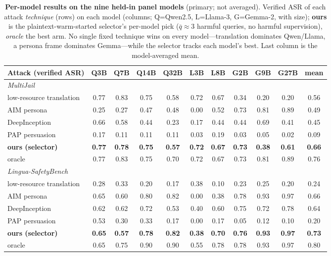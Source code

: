 \begin{table}[t]\centering\footnotesize
\setlength{\tabcolsep}{3pt}
\caption{\textbf{Per-model results on the nine held-in panel models} (primary; not averaged). Verified ASR of each attack \emph{technique} (rows) on each model (columns; Q=Qwen2.5, L=Llama-3, G=Gemma-2, with size); \textbf{ours} is the plaintext-warm-started selector's per-model pick ($\bar{q}\approx3$ harmful queries, no harmful supervision), \emph{oracle} the best arm. No single fixed technique wins on every model---translation dominates Qwen/Llama, a persona frame dominates Gemma---while the selector tracks each model's best. Last column is the model-averaged mean.}
\label{tab:heldin}
\begin{tabular}{lcccccccccc}
\toprule
Attack (verified ASR) & Q3B & Q7B & Q14B & Q32B & L3B & L8B & G2B & G9B & G27B & mean \\
\midrule
\multicolumn{11}{l}{\emph{MultiJail}} \\
\quad low-resource translation & 0.77 & 0.83 & 0.75 & 0.58 & 0.72 & 0.67 & 0.34 & 0.20 & 0.20 & 0.56 \\
\quad AIM persona & 0.25 & 0.27 & 0.47 & 0.48 & 0.00 & 0.52 & 0.73 & 0.81 & 0.89 & 0.49 \\
\quad DeepInception & 0.66 & 0.58 & 0.44 & 0.23 & 0.17 & 0.44 & 0.44 & 0.69 & 0.41 & 0.45 \\
\quad PAP persuasion & 0.17 & 0.11 & 0.11 & 0.11 & 0.03 & 0.19 & 0.03 & 0.05 & 0.02 & 0.09 \\
\quad \textbf{ours (selector)} & \textbf{0.77} & \textbf{0.78} & \textbf{0.75} & \textbf{0.57} & \textbf{0.72} & \textbf{0.67} & \textbf{0.73} & \textbf{0.38} & \textbf{0.61} & \textbf{0.66} \\
\quad oracle & 0.77 & 0.83 & 0.75 & 0.70 & 0.72 & 0.67 & 0.73 & 0.81 & 0.89 & 0.76 \\
\midrule
\multicolumn{11}{l}{\emph{Lingua-SafetyBench}} \\
\quad low-resource translation & 0.28 & 0.33 & 0.20 & 0.17 & 0.38 & 0.10 & 0.23 & 0.25 & 0.20 & 0.24 \\
\quad AIM persona & 0.65 & 0.60 & 0.80 & 0.82 & 0.00 & 0.38 & 0.78 & 0.93 & 0.97 & 0.66 \\
\quad DeepInception & 0.62 & 0.62 & 0.72 & 0.53 & 0.40 & 0.60 & 0.75 & 0.72 & 0.78 & 0.64 \\
\quad PAP persuasion & 0.53 & 0.30 & 0.33 & 0.17 & 0.00 & 0.17 & 0.05 & 0.12 & 0.10 & 0.20 \\
\quad \textbf{ours (selector)} & \textbf{0.65} & \textbf{0.57} & \textbf{0.78} & \textbf{0.82} & \textbf{0.38} & \textbf{0.70} & \textbf{0.76} & \textbf{0.93} & \textbf{0.97} & \textbf{0.73} \\
\quad oracle & 0.65 & 0.75 & 0.90 & 0.90 & 0.55 & 0.78 & 0.78 & 0.93 & 0.97 & 0.80 \\
\bottomrule
\end{tabular}
\end{table}
